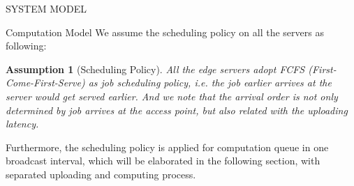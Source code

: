 \documentclass[10pt, conference, letterpaper]{IEEEtran}
\newtheorem{assumption}{Assumption}
\begin{document}
\begin{section}{SYSTEM MODEL}
\begin{subsection}{Computation Model}
            We assume the scheduling policy on all the servers as following:
            \begin{assumption}[Scheduling Policy]
                All the edge servers adopt \emph{FCFS} (First-Come-First-Serve) as job scheduling policy, i.e. the job earlier arrives at the server would get served earlier. And we note that the arrival order is not only determined by job arrives at the access point, but also related with the uploading latency.
            \end{assumption}
            Furthermore, the scheduling policy is applied for computation queue in one broadcast interval, which will be elaborated in the following section, with separated uploading and computing process.
        \end{subsection}
    \end{section}
\end{document}
